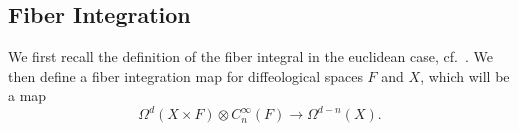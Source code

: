 \documentclass{scrartcl}
\theoremstyle{plain}
\theoremstyle{definition}
\newtheorem{remark}[theorem]{Remark}
\newcommand{\APL}{A_{PL}}
\newcommand{\from}{\leftarrow}
\DeclareMathOperator{\Map}{Map}
\begin{document}







\subsection{Fiber Integration}\label{subsec:fiber-integration}
We first recall the definition of the fiber integral in the euclidean case, cf.\ \cite{bott1982differential}. We then define a fiber integration map for diffeological spaces $F$ and $X$, which will be a map
$$\Omega^d(X\times F) \otimes C_n^\infty(F)\to\Omega^{d-n}(X).$$
\end{document}
